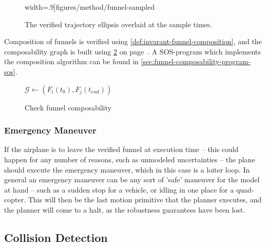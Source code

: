 \begin{figure}[!t]
\begin{minipage}[c]{.45\columnwidth}
    width=.9\columnwidth]{figures/method/funnel-sampled}
    \caption{The verified trajectory ellipsis overlaid at the sample times.}
  \end{minipage}
    \label{fig:funnel-straight-sampled}
\end{figure}

Composition of funnels is verified using \cref{def:invarant-funnel-composition},
and the composability graph is built using \cref{alg:create-funnel-graph} on
page~\pageref{alg:create-funnel-graph}. A \ac{SOS}-program which implements the
composition algorithm can be found in
\cref{sec:funnel-composability-program-sos}.

\begin{figure}[!t]
  \caption{Check funnel composability}
  \label{alg:create-funnel-graph}
  \begin{algorithmic}[0]
     
      \State \(\mathcal{G} \leftarrow{} \left( F_{i}(t_{0}), F_{j}(t_{end})
      \right)\)
    \EndIf
    \EndFor
    \EndFor
    \EndProcedure
  \end{algorithmic}
\end{figure}


\subsubsection{Emergency Maneuver}

If the airplane is to leave the verified funnel at execution time -- this could
happen for any number of reasons, such as unmodeled uncertainties -- the plane
should execute the emergency maneuver, which in this case is a loiter loop. In
general an emergency maneuver can be any sort of 'safe' maneuver for the model
at hand -- such as a sudden stop for a vehicle, or idling in one place for a
quad-copter. This will then be the last motion primitive that the planner
executes, and the planner will come to a halt, as the robustness guarantees have
been lost.


\subsection{Collision Detection}

